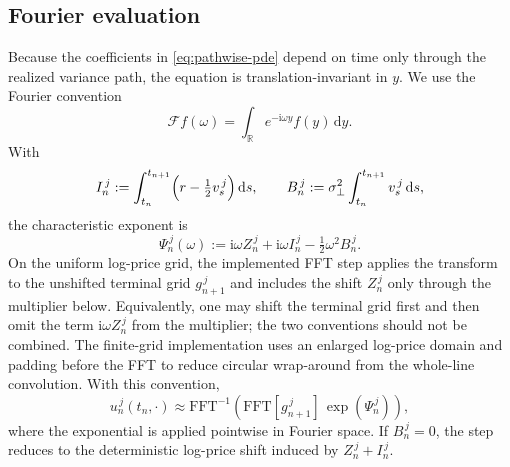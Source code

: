 \documentclass[10pt]{article}
\theoremstyle{plain}
\theoremstyle{definition}
\theoremstyle{remark}
\newcommand{\dd}{\mathrm d}
\begin{document}
\subsection{Fourier evaluation}
Because the coefficients in \eqref{eq:pathwise-pde} depend on time only through the realized variance path, the equation is translation-invariant in $y$. We use the Fourier convention
\[
\mathcal F f(\omega)=\int_{\mathbb R}e^{-\mathrm i\omega y}f(y)\,\dd y.
\]
With
\[
I_n^{\,j}:=\int_{t_n}^{t_{n+1}}\Bigl(r-\tfrac12 v_s^{\,j}\Bigr)\,\dd s,
\qquad
B_n^{\,j}:=\sigma_\perp^2\int_{t_n}^{t_{n+1}}v_s^{\,j}\,\dd s,
\]
the characteristic exponent is
\[
\Psi_n^{\,j}(\omega)
:=\mathrm i\omega Z_n^{\,j}+\mathrm i\omega I_n^{\,j}
-\tfrac12\omega^2B_n^{\,j}.
\]
On the uniform log-price grid, the implemented FFT step applies the transform to the unshifted terminal grid
$g_{n+1}^{\,j}$ and includes the shift $Z_n^{\,j}$ only through the multiplier below. Equivalently, one may shift
the terminal grid first and then omit the term $\mathrm i\omega Z_n^{\,j}$ from the multiplier; the two
conventions should not be combined. The finite-grid implementation uses an enlarged log-price domain and padding
before the FFT to reduce circular wrap-around from the whole-line convolution. With this convention,
\begin{equation}
u_n^{\,j}(t_n,\cdot)
\approx
\mathrm{FFT}^{-1}\!\left(
\mathrm{FFT}[g_{n+1}^{\,j}]\,\exp(\Psi_n^{\,j})
\right),
\label{eq:fft-recursion}
\end{equation}
where the exponential is applied pointwise in Fourier space. If $B_n^{\,j}=0$, the step reduces to the deterministic log-price shift induced by $Z_n^{\,j}+I_n^{\,j}$.
\end{document}
